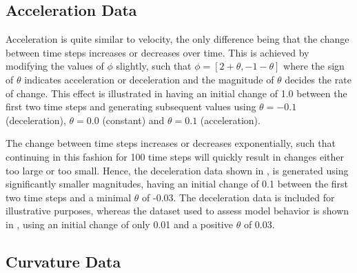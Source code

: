     \subsection{Acceleration Data}
    
        Acceleration is quite similar to velocity, the only difference being that the change between time steps increases or decreases over time. This is achieved by modifying the values of $\phi$ slightly, such that $\phi=[2+\theta,-1-\theta]$ where the sign of $\theta$ indicates acceleration or deceleration and the magnitude of $\theta$ decides the rate of change. This effect is illustrated in  having an initial change of 1.0 between the first two time steps and generating subsequent values using $\theta=-0.1$ (deceleration), $\theta=0.0$ (constant) and $\theta=0.1$ (acceleration).
        
        The change between time steps increases or decreases exponentially, such that continuing in this fashion for 100 time steps will quickly result in changes either too large or too small. Hence, the deceleration data shown in , is generated using significantly smaller magnitudes, having an initial change of 0.1 between the first two time steps and a minimal $\theta$ of -0.03.
        The deceleration data is included for illustrative purposes, whereas the dataset used to assess model behavior is shown in , using an initial change of only 0.01 and a positive $\theta$ of $0.03$.
    
    \subsection{Curvature Data}
    
